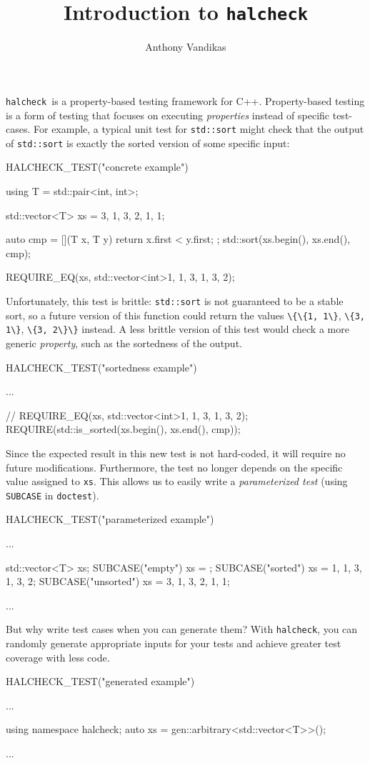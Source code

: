\documentclass{article}
\newcommand{\cppinline}[1]{\lstinline[style=cpp]|#1|}
\newcommand{\halcheck}{\texttt{halcheck}}
\begin{document}
\title{Introduction to \halcheck}
\author{Anthony Vandikas}
\maketitle

\halcheck\ is a property-based testing framework for C++. Property-based testing is a form of testing that focuses on executing \emph{properties} instead of specific test-cases. For example, a typical unit test for \cppinline{std::sort} might check that the output of \cppinline{std::sort} is exactly the sorted version of some specific input:
\begin{cppcode}
  HALCHECK_TEST("concrete example") {
    using T = std::pair<int, int>;

    std::vector<T> xs = {{3, 1}, {3, 2}, {1, 1}};

    auto cmp = [](T x, T y) { return x.first < y.first; };
    std::sort(xs.begin(), xs.end(), cmp);

    REQUIRE_EQ(xs, std::vector<int>{{1, 1}, {3, 1}, {3, 2}});
  }
\end{cppcode}
Unfortunately, this test is brittle: \cppinline{std::sort} is not guaranteed to be a stable sort, so a future version of this function could return the values \cppinline{\{\{1, 1\}},  \cppinline{\{3, 1\}},  \cppinline{\{3, 2\}\}} instead. A less brittle version of this test would check a more generic \emph{property}, such as the sortedness of the output.
\begin{cppcode}
  HALCHECK_TEST("sortedness example") {
    ...

    // REQUIRE_EQ(xs, std::vector<int>{{1, 1}, {3, 1}, {3, 2}});
    REQUIRE(std::is_sorted(xs.begin(), xs.end(), cmp));
  }
\end{cppcode}
Since the expected result in this new test is not hard-coded, it will require no future modifications. Furthermore, the test no longer depends on the specific value assigned to \cppinline{xs}. This allows us to easily write a \emph{parameterized test} (using \cppinline{SUBCASE} in \cppinline{doctest}).
\begin{cppcode}
  HALCHECK_TEST("parameterized example") {
    ...

    std::vector<T> xs;
    SUBCASE("empty")    { xs = {}; }
    SUBCASE("sorted")   { xs = {{1, 1}, {3, 1}, {3, 2}}; }
    SUBCASE("unsorted") { xs = {{3, 1}, {3, 2}, {1, 1}}; }

    ...
  }
\end{cppcode}
But why write test cases when you can generate them? With \halcheck{}, you can randomly generate appropriate inputs for your tests and achieve greater test coverage with less code.
\begin{cppcode}
  HALCHECK_TEST("generated example") {
    ...

    using namespace halcheck;
    auto xs = gen::arbitrary<std::vector<T>>();

    ...
  }
\end{cppcode}
\end{document}
